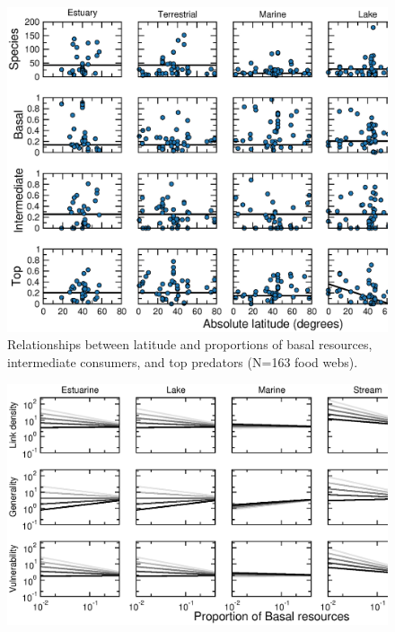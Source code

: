 \documentclass[12pt]{article}
\begin{document}
\begin{figure}[!h]
\label{TLs_v_lat}
\includegraphics[width=.9\textwidth]{Figures/by_TL/properties_vs_lat/proportions/nonts_TLvlat.eps}
\caption{Relationships between latitude and proportions of basal resources, intermediate consumers, and top predators (N=163 food webs). }
\end{figure}

\newpage

\begin{figure}[!h]
\label{S}
\includegraphics[width=.9\textwidth]{Figures/by_TL/scaling_with_S/proportions/B_latlines_nonts.eps}
\caption{}
\end{figure}
\end{document}
